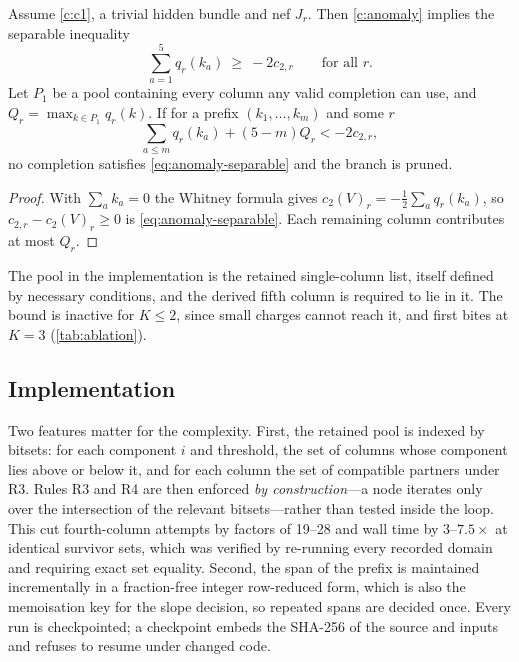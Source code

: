 \begin{proposition}\label{prop:anomalybudget}
Assume \ref{c:c1}, a trivial hidden bundle and nef $J_r$. Then \ref{c:anomaly}
implies the separable inequality
\begin{equation}\label{eq:anomaly-separable}
\textstyle\sum_{a=1}^5q_r(k_a)\ \ge\ -2c_{2,r}\qquad\text{for all }r .
\end{equation}
Let $P_1$ be a pool containing every column any valid completion can use, and
$Q_r=\max_{k\in P_1}q_r(k)$. If for a prefix $(k_1,\dots,k_m)$ and some $r$
\[
\textstyle\sum_{a\le m}q_r(k_a)+(5-m)Q_r<-2c_{2,r},
\]
no completion satisfies \eqref{eq:anomaly-separable} and the branch is pruned.
\end{proposition}
\begin{proof}
With $\sum_ak_a=0$ the Whitney formula gives
$c_2(V)_r=-\tfrac12\sum_aq_r(k_a)$, so $c_{2,r}-c_2(V)_r\ge0$ is
\eqref{eq:anomaly-separable}. Each remaining column contributes at most $Q_r$.
\end{proof}

The pool in the implementation is the retained single-column list, itself
defined by necessary conditions, and the derived fifth column is required to
lie in it. The bound is inactive for $K\le2$, since small charges cannot reach
it, and first bites at $K=3$ (\cref{tab:ablation}).

\subsection{Implementation}

Two features matter for the complexity. First, the retained pool is indexed by
bitsets: for each component $i$ and threshold, the set of columns whose
component lies above or below it, and for each column the set of compatible
partners under R3. Rules R3 and R4 are then enforced \emph{by construction}---a
node iterates only over the intersection of the relevant bitsets---rather than
tested inside the loop. This cut fourth-column attempts by factors of 19--28
and wall time by $3$--$7.5\times$ at identical survivor sets, which was
verified by re-running every recorded domain and requiring exact set equality.
Second, the span of the prefix is maintained incrementally in a fraction-free
integer row-reduced form, which is also the memoisation key for the slope
decision, so repeated spans are decided once. Every run is checkpointed; a
checkpoint embeds the SHA-256 of the source and inputs and refuses to resume
under changed code.

